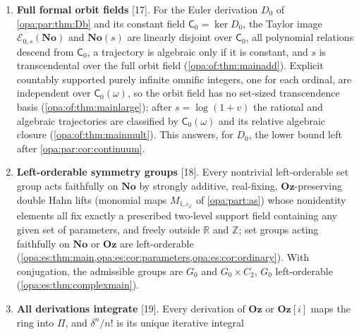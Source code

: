 \documentclass[11pt,oneside]{article}
\numberwithin{equation}{section}
\theoremstyle{definition}
\theoremstyle{remark}
\newcommand{\No}{\mathbf{No}}
\newcommand{\Oz}{\mathbf{Oz}}
\newcommand{\Og}{\mathbf{Oz}[i]}
\newcommand{\R}{\mathbb R}
\newcommand{\Q}{\mathbb Q}
\newcommand{\Z}{\mathbb Z}
\newcommand{\EE}{\mathcal E}
\newcommand{\Hom}{\operatorname{Hom}}
\newcommand{\src}[1]{\textup{\textsf{\small[#1]}}}
\begin{document}
\begin{enumerate}[label=\textup{(\arabic*)},leftmargin=*,itemsep=3pt]
denominator-cleared form defines $\Oz$ and $\Og$ in their monoid algebras
(\cref{opa:cr:thm:quartic}). A nonmonomial $P/Q$ that is an $n$th power in any
monomial extension has $n\le\max(\operatorname{wt}P,\operatorname{wt}Q)-1$, sharply
(\cref{opa:cr:thm:sparse}). Consequently \cref{opa:par:thm:poly,opa:par:thm:laurent,opa:par:thm:cancellation,opa:par:thm:aut}
extend to monoid algebras of arbitrary rank, cancellation of finite rank
(\cref{opa:cr:thm:rootembedding,opa:cr:thm:ringautos,opa:cr:thm:finitecancel}), with
exact failure for $\Q^{(\kappa)}$, $\kappa$ infinite (\cref{opa:cr:thm:threshold}); and,
granted a defect theorem of Lin and Wang, every field automorphism of $F(U^G)$ is
monomial exactly when $\Hom(G,\Z)=0$ (\cref{opa:cr:thm:auto}). These are
finite-support extensions, not Hahn fields (\cref{opa:cr:ex:hahn}).
\item \textbf{Full formal orbit fields} \src{17}. For the Euler derivation $D_0$ of
\cref{opa:par:thm:Db} and its constant field $\mathsf C_0=\ker D_0$, the Taylor image
$\EE_{0,s}(\No)$ and $\No(s)$ are linearly disjoint over $\mathsf C_0$, all polynomial
relations descend from $\mathsf C_0$, a trajectory is algebraic only if it is constant,
and $s$ is transcendental over the full orbit field (\cref{opa:of:thm:mainadd}).
Explicit countably supported purely infinite omnific integers, one for each ordinal,
are independent over $\mathsf C_0(\omega)$, so the orbit field has no set-sized
transcendence basis (\cref{opa:of:thm:mainlarge}); after $s=\log(1+v)$ the rational
and algebraic trajectories are classified by $\mathsf C_0(\omega)$ and its relative
algebraic closure (\cref{opa:of:thm:mainmult}). This answers, for $D_0$, the lower
bound left after \cref{opa:par:cor:continuum}.
\item \textbf{Left-orderable symmetry groups} \src{18}. Every nontrivial left-orderable
set group acts faithfully on $\No$ by strongly additive, real-fixing, $\Oz$-preserving
double Hahn lifts (monomial maps $M_{1,\iota_\varphi}$ of \cref{opa:part:as}) whose
nonidentity elements all fix exactly a prescribed two-level support field containing
any given set of parameters, and freely outside $\R$ and $\Z$; set groups acting
faithfully on $\No$ or $\Oz$ are left-orderable
(\cref{opa:es:thm:main,opa:es:cor:parameters,opa:es:cor:ordinary}). With conjugation,
the admissible groups are $G_0$ and $G_0\times C_2$, $G_0$ left-orderable
(\cref{opa:es:thm:complexmain}).
\item \textbf{All derivations integrate} \src{19}. Every derivation of $\Oz$ or $\Og$
maps the ring into $\Pi$, and $\delta^n/n!$ is its unique iterative integral

\end{enumerate}
\end{document}
